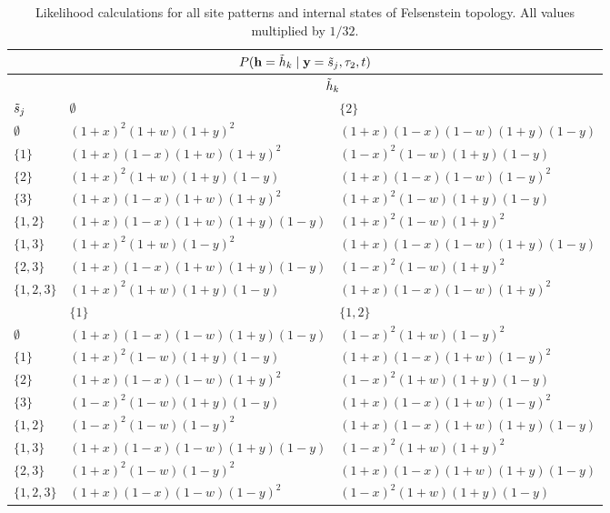 \begin{table}
\centering
\begin{tabular}{|l|ll|}
\multicolumn{3}{c}{$P(\mathbf{h}=\tilde{h}_k\mid \mathbf{y}=\tilde{s}_j,\tau_2,t)$}\\
\hline
& \multicolumn{2}{|c|}{$\tilde{h}_k$}\\
    \hline
    $\tilde{s}_j$    &$\emptyset$                                &$\{2\}$  \\
    \hline
     $\emptyset$   &$(1+x)^2   (1+w)(1+y)^2$           &$(1+x)(1-x)(1-w)(1+y)(1-y)$\\
     $\{1\}$       &$(1+x)(1-x)(1+w)(1+y)^2$           &$(1-x)^2   (1-w)(1+y)(1-y)$\\
     $\{2\}$       &$(1+x)^2   (1+w)(1+y)(1-y)$        &$(1+x)(1-x)(1-w)(1-y)^2$\\
     $\{3\}$       &$(1+x)(1-x)(1+w)(1+y)^2$           &$(1+x)^2   (1-w)(1+y)(1-y)$\\
     $\{1,2\}$     &$(1+x)(1-x)(1+w)(1+y)(1-y)$        &$(1+x)^2   (1-w)(1+y)^2$\\
     $\{1,3\}$     &$(1+x)^2   (1+w)(1-y)^2$           &$(1+x)(1-x)(1-w)(1+y)(1-y)$\\
     $\{2,3\}$     &$(1+x)(1-x)(1+w)(1+y)(1-y)$        &$(1-x)^2   (1-w)(1+y)^2$\\
     $\{1,2,3\}$   &$(1+x)^2   (1+w)(1+y)(1-y)$        &$(1+x)(1-x)(1-w)(1+y)^2$\\
    \hline
    \hline
    &$\{1\}$                             &$\{1,2\}$  \\
    \hline
     $\emptyset$   &$(1+x)(1-x)(1-w)(1+y)(1-y)$        &$(1-x)^2   (1+w)(1-y)^2$\\
     $\{1\}$       &$(1+x)^2   (1-w)(1+y)(1-y)$        &$(1+x)(1-x)(1+w)(1-y)^2$\\
     $\{2\}$       &$(1+x)(1-x)(1-w)(1+y)^2$           &$(1-x)^2   (1+w)(1+y)(1-y)$\\
     $\{3\}$       &$(1-x)^2   (1-w)(1+y)(1-y)$        &$(1+x)(1-x)(1+w)(1-y)^2$\\
     $\{1,2\}$     &$(1-x)^2   (1-w)(1-y)^2$           &$(1+x)(1-x)(1+w)(1+y)(1-y)$\\
     $\{1,3\}$     &$(1+x)(1-x)(1-w)(1+y)(1-y)$        &$(1-x)^2   (1+w)(1+y)^2$\\
     $\{2,3\}$     &$(1+x)^2   (1-w)(1-y)^2$           &$(1+x)(1-x)(1+w)(1+y)(1-y)$\\
     $\{1,2,3\}$   &$(1+x)(1-x)(1-w)(1-y)^2$           &$(1-x)^2   (1+w)(1+y)(1-y)$\\
\hline
\end{tabular}
\caption{Likelihood calculations for all site patterns and internal states of Felsenstein topology.
All values multiplied by $1/32$.}
\label{tab:fels_likelihoods}
\end{table}

